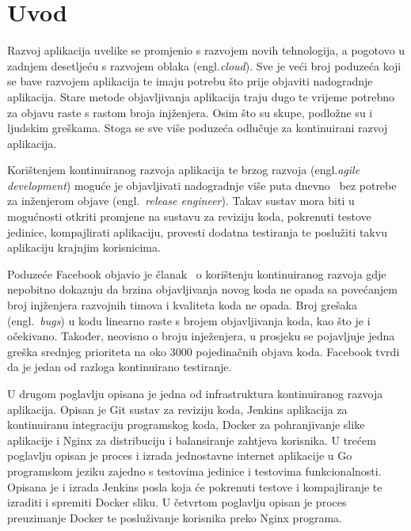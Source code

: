 \chapter{Uvod}
Razvoj aplikacija uvelike se promjenio s razvojem novih tehnologija, a pogotovo u zadnjem desetljeću
s razvojem oblaka (engl.\textit{cloud}). Sve je veći broj poduzeća koji se bave razvojem aplikacija
te imaju potrebu što prije objaviti nadogradnje aplikacija. Stare metode objavljivanja aplikacija
traju dugo te vrijeme potrebno za objavu raste s rastom broja injženjera. Osim što su skupe,
podložne su i ljudskim greškama. Stoga se sve više poduzeća odlučuje za kontinuirani razvoj
aplikacija.

Korištenjem kontinuiranog razvoja aplikacija te brzog razvoja (engl.\textit{agile development})
moguće je objavljivati nadogradnje više puta dnevno~\citep{abrahamsson2017agile} bez potrebe za
inženjerom objave (engl.~\textit{release engineer}). Takav sustav mora biti u mogućnosti otkriti
promjene na sustavu za reviziju koda, pokrenuti testove jedinice, kompajlirati aplikaciju, provesti
dodatna testiranja te poslužiti takvu aplikaciju krajnjim korisnicima.

Poduzeće Facebook objavio je članak~\citep{rossi2016continuous} o korištenju kontinuiranog razvoja
gdje nepobitno dokazuju da brzina objavljivanja novog koda ne opada sa povećanjem broj injženjera
razvojnih timova i kvaliteta koda ne opada. Broj grešaka (engl.~\textit{bugs}) u kodu linearno raste
s brojem objavljivanja koda, kao što je i očekivano. Također, neovisno o broju inježenjera, u
prosjeku se pojavljuje jedna greška srednjeg prioriteta na oko 3000 pojedinačnih objava koda.
Facebook tvrdi da je jedan od razloga kontinuirano testiranje.

U drugom poglavlju opisana je jedna od infrastruktura kontinuiranog razvoja aplikacija. Opisan je
Git sustav za reviziju koda, Jenkins aplikacija za kontinuiranu integraciju programskog koda,
Docker za pohranjivanje slike aplikacije i Nginx za distribuciju i balansiranje zahtjeva korisnika.
U trećem poglavlju opisan je proces i izrada jednostavne internet aplikacije u Go programskom jeziku
zajedno s testovima jedinice i testovima funkcionalnosti. Opisana je i izrada Jenkins posla koja će
pokrenuti testove i kompajliranje te izraditi i spremiti Docker sliku. U četvrtom poglavlju opisan
je proces preuzimanje Docker te posluživanje korisnika preko Nginx programa.

